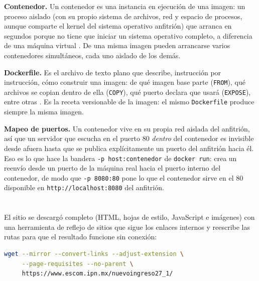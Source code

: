 \documentclass[10pt,a4paper]{article}
\begin{document}
\textbf{Contenedor.} Un contenedor es una instancia en ejecución de una imagen: un proceso aislado (con su propio sistema de archivos, red y espacio de procesos, aunque comparte el kernel del sistema operativo anfitrión) que arranca en segundos porque no tiene que iniciar un sistema operativo completo, a diferencia de una máquina virtual \cite{docker-overview}. De una misma imagen pueden arrancarse varios contenedores simultáneos, cada uno aislado de los demás.

\textbf{Dockerfile.} Es el archivo de texto plano que describe, instrucción por instrucción, cómo construir una imagen: de qué imagen base parte (\texttt{FROM}), qué archivos se copian dentro de ella (\texttt{COPY}), qué puerto declara que usará (\texttt{EXPOSE}), entre otras \cite{dockerfile-ref}. Es la receta versionable de la imagen: el mismo \texttt{Dockerfile} produce siempre la misma imagen.

\textbf{Mapeo de puertos.} Un contenedor vive en su propia red aislada del anfitrión, así que un servidor que escucha en el puerto 80 \emph{dentro} del contenedor es invisible desde afuera hasta que se publica explícitamente un puerto del anfitrión hacia él. Eso es lo que hace la bandera \texttt{-p host:contenedor} de \texttt{docker run}: crea un reenvío desde un puerto de la máquina real hacia el puerto interno del contenedor, de modo que \texttt{-p 8080:80} pone lo que el contenedor sirve en el 80 disponible en \texttt{http://localhost:8080} del anfitrión.

\section{\color{colorIPN}{Desarrollo}}

\subsection{\color{colorESCOM}{Descarga del contenido del minisitio}}

El sitio se descargó completo (HTML, hojas de estilo, JavaScript e imágenes) con una herramienta de reflejo de sitios que sigue los enlaces internos y reescribe las rutas para que el resultado funcione sin conexión:

\begin{lstlisting}[language=bash, caption={Descarga completa del minisitio con wget}]
wget --mirror --convert-links --adjust-extension \
     --page-requisites --no-parent \
     https://www.escom.ipn.mx/nuevoingreso27_1/
\end{lstlisting}
\end{document}
